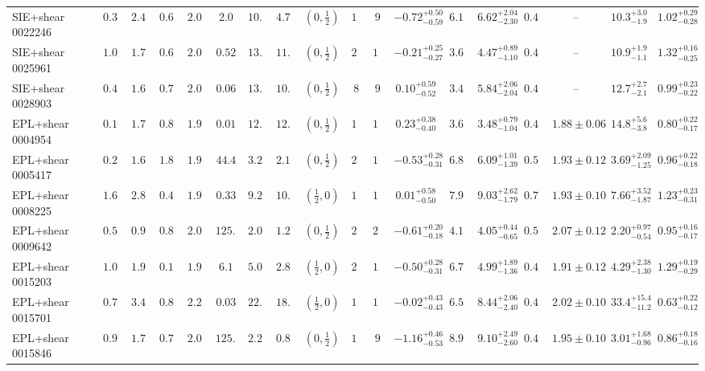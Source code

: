 \begin{longtable}{@{}lccccccccccccccccc@{}}
SIE+shear 0022246 & $0.38$ & $2.41$ & $0.67$ & $2.00$ & $2.0$ & $10.7$ & $4.71$ & $(0,\frac12)$ & $12$ & $9$ & $-0.72^{+0.50}_{-0.59}$ & $6.12$ & $6.62^{+2.04}_{-2.30}$ & $0.49$ & -- & $10.3^{+3.0}_{-1.9}$ & $1.02^{+0.29}_{-0.28}$\\
SIE+shear 0025961 & $1.01$ & $1.71$ & $0.67$ & $2.00$ & $0.52$ & $13.1$ & $11.9$ & $(0,\frac12)$ & $23$ & $16$ & $-0.21^{+0.25}_{-0.27}$ & $3.64$ & $4.47^{+0.89}_{-1.10}$ & $0.49$ & -- & $10.9^{+1.9}_{-1.1}$ & $1.32^{+0.16}_{-0.25}$\\
SIE+shear 0028903 & $0.43$ & $1.65$ & $0.70$ & $2.00$ & $0.06$ & $13.1$ & $10.1$ & $(0,\frac12)$ & $8$ & $9$ & $0.10^{+0.59}_{-0.52}$ & $3.48$ & $5.84^{+2.06}_{-2.04}$ & $0.43$ & -- & $12.7^{+2.7}_{-2.1}$ & $0.99^{+0.23}_{-0.22}$\\
EPL+shear 0004954 & $0.12$ & $1.71$ & $0.85$ & $1.94$ & $0.01$ & $12.7$ & $12.6$ & $(0,\frac12)$ & $11$ & $12$ & $0.23^{+0.38}_{-0.40}$ & $3.69$ & $3.48^{+0.79}_{-1.04}$ & $0.42$ & $1.88\pm0.06$ & $14.8^{+5.6}_{-3.8}$ & $0.80^{+0.22}_{-0.17}$\\
EPL+shear 0005417 & $0.21$ & $1.61$ & $1.82$ & $1.97$ & $44.4$ & $3.20$ & $2.12$ & $(0,\frac12)$ & $23$ & $13$ & $-0.53^{+0.28}_{-0.31}$ & $6.84$ & $6.09^{+1.01}_{-1.39}$ & $0.52$ & $1.93\pm0.12$ & $3.69^{+2.09}_{-1.25}$ & $0.96^{+0.22}_{-0.18}$\\
EPL+shear 0008225 & $1.63$ & $2.82$ & $0.40$ & $1.92$ & $0.33$ & $9.24$ & $10.7$ & $(\frac12,0)$ & $14$ & $10$ & $0.01^{+0.58}_{-0.50}$ & $7.94$ & $9.03^{+2.62}_{-1.79}$ & $0.71$ & $1.93\pm0.10$ & $7.66^{+3.52}_{-1.87}$ & $1.23^{+0.23}_{-0.31}$\\
EPL+shear 0009642 & $0.55$ & $0.91$ & $0.89$ & $2.04$ & $125.5$ & $2.09$ & $1.25$ & $(0,\frac12)$ & $27$ & $22$ & $-0.61^{+0.20}_{-0.18}$ & $4.18$ & $4.05^{+0.44}_{-0.65}$ & $0.50$ & $2.07\pm0.12$ & $2.20^{+0.97}_{-0.54}$ & $0.95^{+0.16}_{-0.17}$\\
EPL+shear 0015203 & $1.03$ & $1.93$ & $0.19$ & $1.93$ & $6.1$ & $5.06$ & $2.87$ & $(\frac12,0)$ & $22$ & $13$ & $-0.50^{+0.28}_{-0.31}$ & $6.76$ & $4.99^{+1.89}_{-1.36}$ & $0.44$ & $1.91\pm0.12$ & $4.29^{+2.38}_{-1.30}$ & $1.29^{+0.19}_{-0.29}$\\
EPL+shear 0015701 & $0.76$ & $3.49$ & $0.83$ & $2.21$ & $0.03$ & $22.4$ & $18.9$ & $(\frac12,0)$ & $11$ & $11$ & $-0.02^{+0.43}_{-0.43}$ & $6.58$ & $8.44^{+2.06}_{-2.40}$ & $0.45$ & $2.02\pm0.10$ & $33.4^{+15.4}_{-11.2}$ & $0.63^{+0.22}_{-0.12}$\\
EPL+shear 0015846 & $0.93$ & $1.74$ & $0.76$ & $2.09$ & $125.4$ & $2.23$ & $0.80$ & $(0,\frac12)$ & $17$ & $9$ & $-1.16^{+0.46}_{-0.53}$ & $8.98$ & $9.10^{+2.49}_{-2.60}$ & $0.45$ & $1.95\pm0.10$ & $3.01^{+1.68}_{-0.96}$ & $0.86^{+0.18}_{-0.16}$\\

\end{longtable}
